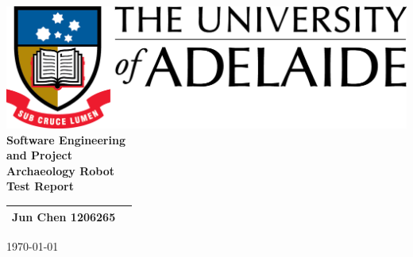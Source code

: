 \begin{center}
\includegraphics[scale=1.5]{./UniLogo}\\[3cm]    
\textbf{\Huge \bfseries Software Engineering \\ and Project}\\[2.5cm]



\textbf{\huge Archaeology Robot}\\[0.5cm]
\textbf{ \huge Test Report }\\[2cm]



\begin{tabular}{ |c | p{2cm} |}
	\hline
Jun Chen 1206265 & \\[.5cm] \hline
\end{tabular}


\vfill

{\large \today}

\end{center}

